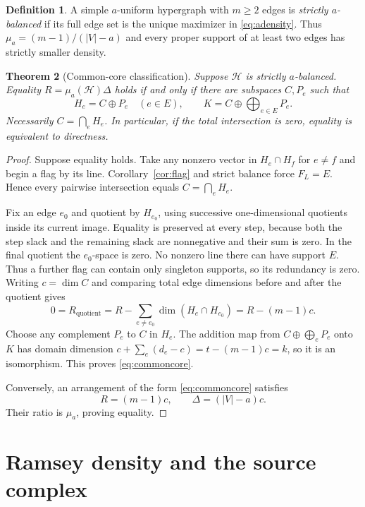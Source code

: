 \documentclass[11pt]{article}
\newtheorem{theorem}{Theorem}[section]
\theoremstyle{definition}
\newtheorem{definition}[theorem]{Definition}
\theoremstyle{remark}
\newcommand{\1}{\mathbf 1}
\begin{document}
\begin{definition}
A simple $a$-uniform hypergraph with $m\ge2$ edges is \emph{strictly
$a$-balanced} if its full edge set is the unique maximizer in
\eqref{eq:adensity}. Thus
$\mu_a=(m-1)/(|V|-a)$ and every proper support of at least two edges has
strictly smaller density.
\end{definition}

\begin{theorem}[Common-core classification]
\label{thm:equality}
Suppose $\mathcal H$ is strictly $a$-balanced. Equality
$R=\mu_a(\mathcal H)\Delta$ holds if and only if there are subspaces $C,P_e$
such that
\begin{equation}
 H_e=C\oplus P_e\quad(e\in E),\qquad
 K=C\oplus\bigoplus_{e\in E}P_e.
 \label{eq:commoncore}
\end{equation}
Necessarily $C=\bigcap_eH_e$. In particular, if the total intersection is zero,
equality is equivalent to directness.
\end{theorem}

\begin{proof}
Suppose equality holds. Take any nonzero vector in $H_e\cap H_f$ for $e\ne f$
and begin a flag by its line. Corollary~\ref{cor:flag} and strict balance force
$F_L=E$. Hence every pairwise intersection equals
$C=\bigcap_e H_e$.

Fix an edge $e_0$ and quotient by $H_{e_0}$, using successive one-dimensional
quotients inside its current image. Equality is preserved at every step,
because both the step slack and the remaining slack are nonnegative and their
sum is zero. In the final quotient the $e_0$-space is zero. No nonzero line
there can have support $E$. Thus a further flag can contain only singleton
supports, so its redundancy is zero. Writing $c=\dim C$ and comparing total
edge dimensions before and after the quotient gives
\[
 0=R_{\mathrm{quotient}}
 =R-\sum_{e\ne e_0}\dim(H_e\cap H_{e_0})
 =R-(m-1)c.
\]
Choose any complement $P_e$ to $C$ in $H_e$. The addition map from
$C\oplus\bigoplus_eP_e$ onto $K$ has domain dimension
$c+\sum_e(d_e-c)=t-(m-1)c=k$, so it is an isomorphism. This proves
\eqref{eq:commoncore}.

Conversely, an arrangement of the form \eqref{eq:commoncore} satisfies
\[
 R=(m-1)c,\qquad \Delta=(|V|-a)c.
\]
Their ratio is $\mu_a$, proving equality.
\end{proof}

\section{Ramsey density and the source complex}
\label{sec:density}
\end{document}
